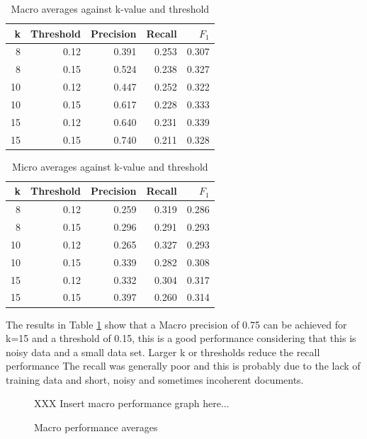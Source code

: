 \documentclass[twocolumn]{article}
\begin{document}
\begin{table}
\begin{tabular}{|r|r|r|r|r|}
\hline
k  & Threshold & Precision & Recall & $F_1$ \\ \hline
8  & 0.12 & 0.391 & 0.253 & 0.307 \\ \hline
8  & 0.15 & 0.524 & 0.238 & 0.327 \\ \hline
10 & 0.12 & 0.447 & 0.252 & 0.322 \\ \hline
10 & 0.15 & 0.617 & 0.228 & 0.333 \\ \hline
15 & 0.12 & 0.640 & 0.231 & 0.339 \\ \hline
15 & 0.15 & 0.740 & 0.211 & 0.328 \\ \hline
\end{tabular}
\caption{Macro averages against k-value and threshold}
\label{macro-results}
\end{table}

\begin{table}
\begin{tabular}{|r|r|r|r|r|}
\hline
k  & Threshold & Precision & Recall & $F_1$ \\ \hline
8  & 0.12 & 0.259 & 0.319 & 0.286 \\ \hline
8  & 0.15 & 0.296 & 0.291 & 0.293 \\ \hline
10 & 0.12 & 0.265 & 0.327 & 0.293 \\ \hline
10 & 0.15 & 0.339 & 0.282 & 0.308 \\ \hline
15 & 0.12 & 0.332 & 0.304 & 0.317 \\ \hline
15 & 0.15 & 0.397 & 0.260 & 0.314 \\ \hline
\end{tabular}
\caption{Micro averages against k-value and threshold}
\label{micro-results}
\end{table}

The results in Table \ref{macro-results} show that a Macro precision of 0.75 can be achieved for k=15 
and a threshold of 0.15, this is a good performance considering that this is noisy data 
and a small data set. Larger k or thresholds reduce the recall performance The recall 
was generally poor and this is probably due to the lack of training data and short, 
noisy and sometimes incoherent documents.
 
\begin{figure}
XXX Insert macro performance graph here...
\caption{Macro performance averages}
\end{figure}
 
\end{document}
